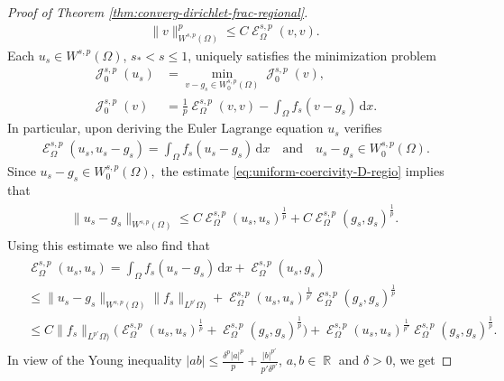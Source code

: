 \documentclass[10pt,a4paper]{amsart}
\DeclareMathOperator{\R}{\mathbb{R}}
\DeclareMathOperator{\cE}{\mathcal{E}}
\DeclareMathOperator{\cJ}{\mathcal{J}}
\renewcommand{\d}{\,\mathrm{d}}
\begin{document}
\begin{proof}[Proof of Theorem \ref{thm:converg-dirichlet-frac-regional}]
%
\begin{align}\label{eq:uniform-coercivity-D-regio}
\|v\|^p_{W^{s,p}(\Omega)}\leq C\cE^{s,p}_\Omega(v,v).
\end{align}
Each $u_s\in W^{s,p}(\Omega)$, $s_*<s\leq 1$, uniquely  satisfies the minimization problem
\begin{align*}
\cJ^{s,p}_0(u_s) &= \min_{v-g_s\in W^{s,p}_0(\Omega)} \cJ^{s,p}_0(v),\\
\cJ^{s,p}_0(v) &= \tfrac{1}{p} \cE^{s,p}_\Omega(v,v)
-\int_\Omega f_s(v-g_s)\d x.
\end{align*}
In particular,  upon deriving the Euler Lagrange equation $u_s$ verifies
\begin{align*}
\cE^{s,p}_\Omega(u_s,u_s-g_s)
=  \int_\Omega f_s ( u_s-g_s)\d x \quad \text{and}\quad u_s-g_s\in W^{s,p}_0(\Omega).
\end{align*}
Since  $u_s-g_s\in W^{s,p}_0(\Omega),$ the estimate \eqref{eq:uniform-coercivity-D-regio} implies that
\begin{align*}
\begin{split}
\| u_s-g_s \|_{W^{s,p}(\Omega)}
\leq C\cE^{s,p}_\Omega(u_s,u_s)^{\frac{1}{p}}+ C\cE^{s,p}_\Omega(g_s,g_s)^{\frac{1}{p}}.
\end{split}
\end{align*}
Using this estimate  we also find that
%
\begin{align*}
\begin{split}
&\cE^{s,p}_\Omega(u_s,u_s)
=\int_\Omega f_s ( u_s-g_s)\d x +\cE^{s,p}_\Omega(u_s,g_s)\\
&\leq \| u_s-g_s \|_{W^{s,p}(\Omega)} \|f_s\|_{L^{p'}\Omega)}+\cE^{s,p}_\Omega(u_s,u_s)^{\frac{1}{p'}}\cE^{s,p}_\Omega(g_s,g_s)^{\frac{1}{p}}\\
&\leq  C \|f_s\|_{L^{p'}\Omega)}\big(
\cE^{s,p}_\Omega(u_s,u_s)^{\frac{1}{p}}+\cE^{s,p}_\Omega(g_s,g_s)^{\frac{1}{p}}\big)
+\cE^{s,p}_\Omega(u_s,u_s)^{\frac{1}{p'}}\cE^{s,p}_\Omega(g_s,g_s)^{\frac{1}{p}}.
\end{split}
\end{align*}
In view of the  Young inequality $|ab|\leq \frac{\delta^p |a|^p}{p}+ \frac{|b|^{p'}}{p'\delta^{p'}} $, $a,b\in \R$ and $\delta>0$,  we get


\end{proof}
\end{document}
